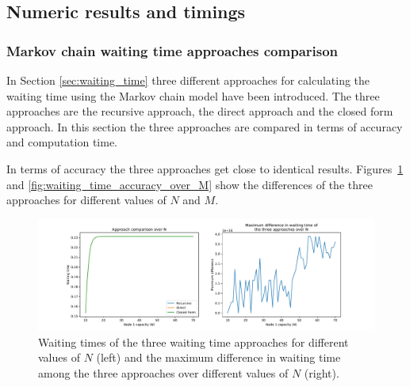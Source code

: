 \subsection{Numeric results and timings}\label{sec:truncation_effect}



\subsubsection{Markov chain waiting time approaches comparison}
\label{sec:waiting_time_approach_comparison}

In Section \ref{sec:waiting_time} three different approaches for calculating
the waiting time using the Markov chain model have been introduced.
The three approaches are the recursive approach, the direct approach and
the closed form approach.  %
In this section the three approaches are compared in terms of accuracy and
computation time.

In terms of accuracy the three approaches get close to identical results.
Figures~\ref{fig:waiting_time_accuracy_over_N} and
\ref{fig:waiting_time_accuracy_over_M} show the differences of the three
approaches for different values of \(N\) and \(M\).


\begin{figure}[H]
    \includegraphics[width=\textwidth]{chapters/03_queueing_model/img/numeric_results_and_timings/waiting_time_formulas_comparison/waiting_time_over_N.pdf}
    \caption{
        Waiting times of the three waiting time approaches for different
        values of \(N\) (left) and the maximum difference in waiting time among
        the three approaches over different values of \(N\) (right).
    }
    \label{fig:waiting_time_accuracy_over_N}
\end{figure}
    

